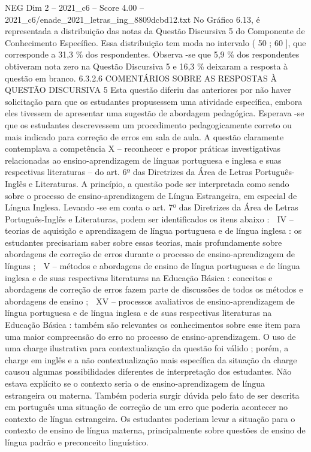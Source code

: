 \begin{textsample}{NEG Dim 2 – 2021\_c6 – Score 4.00 – 2021\_c6/enade\_2021\_letras\_ing\_8809dcbd12.txt}
No Gráfico 6.13, é representada a distribuição das notas da Questão Discursiva 5 do Componente de Conhecimento Específico.
Essa distribuição tem moda no intervalo ( 50 ; 60 ], que corresponde a 31,3 \% dos respondentes.
Observa -se que 5,9 \% dos respondentes obtiveram nota zero na Questão Discursiva 5 e 16,3 \% deixaram a resposta à questão em branco. 6.3.2.6 COMENTÁRIOS SOBRE AS RESPOSTAS À QUESTÃO DISCURSIVA 5 Esta questão diferiu das anteriores por não haver solicitação para que os estudantes propusessem uma atividade específica, embora eles tivessem de apresentar uma sugestão de abordagem pedagógica.
Esperava -se que os estudantes descrevessem um procedimento pedagogicamente correto ou mais indicado para correção de erros em sala de aula.
A questão claramente contemplava a competência X – reconhecer e propor práticas investigativas relacionadas ao ensino-aprendizagem de línguas portuguesa e inglesa e suas respectivas literaturas – do art. 6º das Diretrizes da Área de Letras Português-Inglês e Literaturas.
A princípio, a questão pode ser interpretada como sendo sobre o processo de ensino-aprendizagem de Língua Estrangeira, em especial de Língua Inglesa.
Levando -se em conta o art. 7º das Diretrizes da Área de Letras Português-Inglês e Literaturas, podem ser identificados os itens abaixo :  IV – teorias de aquisição e aprendizagem de língua portuguesa e de língua inglesa : os estudantes precisariam saber sobre essas teorias, mais profundamente sobre abordagens de correção de erros durante o processo de ensino-aprendizagem de línguas ;  V – métodos e abordagens de ensino de língua portuguesa e de língua inglesa e de suas respectivas literaturas na Educação Básica : conceitos e abordagens de correção de erros fazem parte de discussões de todos os métodos e abordagens de ensino ;  XV – processos avaliativos de ensino-aprendizagem de língua portuguesa e de língua inglesa e de suas respectivas literaturas na Educação Básica : também são relevantes os conhecimentos sobre esse item para uma maior compreensão do erro no processo de ensino-aprendizagem.
O uso de uma charge ilustrativa para contextualização da questão foi válido ; porém, a charge em inglês e a não contextualização mais específica da situação da charge causou algumas possibilidades diferentes de interpretação dos estudantes.
Não estava explícito se o contexto seria o de ensino-aprendizagem de língua estrangeira ou materna.
Também poderia surgir dúvida pelo fato de ser descrita em português uma situação de correção de um erro que poderia acontecer no contexto de língua estrangeira.
Os estudantes poderiam levar a situação para o contexto de ensino de língua materna, principalmente sobre questões de ensino de língua padrão e preconceito linguístico.

\end{textsample}
